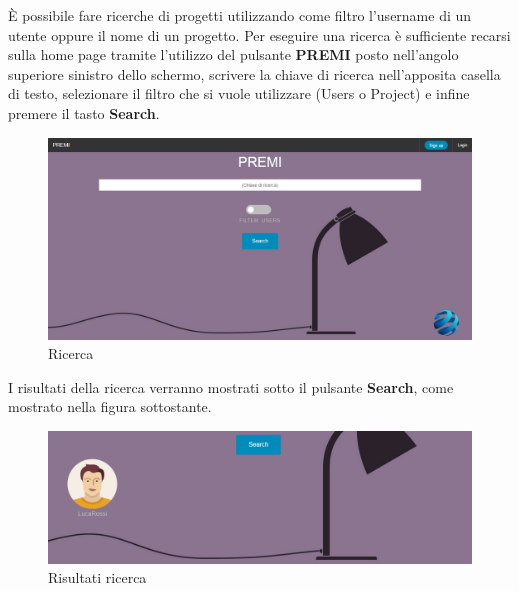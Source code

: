 È possibile fare ricerche di progetti utilizzando come filtro l'username di un utente oppure il nome di un progetto.
\newline
Per eseguire una ricerca è sufficiente recarsi sulla home page tramite l'utilizzo del pulsante \textbf{PREMI} posto nell'angolo superiore sinistro dello schermo, scrivere la chiave di ricerca nell'apposita casella di testo, selezionare il filtro che si vuole utilizzare (Users o Project) e infine premere il tasto \textbf{Search}.

\begin{figure}[h] 
	\centering 
	\includegraphics[scale=0.40] {img/ricerca.png}
	\caption{Ricerca} 
\end{figure}


\noindent I risultati della ricerca verranno mostrati sotto il pulsante \textbf{Search}, come mostrato nella figura sottostante.

\begin{figure}[h] 
	\centering 
	\includegraphics[scale=0.40] {img/ricercaris.png}
	\caption{Risultati ricerca} 
\end{figure}